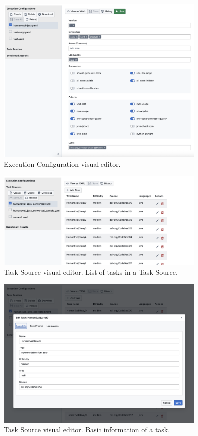 \begin{figure}[H]
    \includegraphics[width=0.9\textwidth]{./images/ui_exec_config}
    \caption{Execution Configuration visual editor.}
    \label{appendix:ui_exec_config}
\end{figure}


\begin{figure}[H]
    \includegraphics[width=0.9\textwidth]{./images/ui_task_source_list}
    \caption{Task Source visual editor. List of tasks in a Task Source.}
    \label{appendix:ui_task_source_list}
\end{figure}

\begin{figure}[H]
    \includegraphics[width=0.9\textwidth]{./images/ui_task_source_info}
    \caption{Task Source visual editor. Basic information of a task.}
    \label{appendix:ui_task_source_info}
\end{figure}

